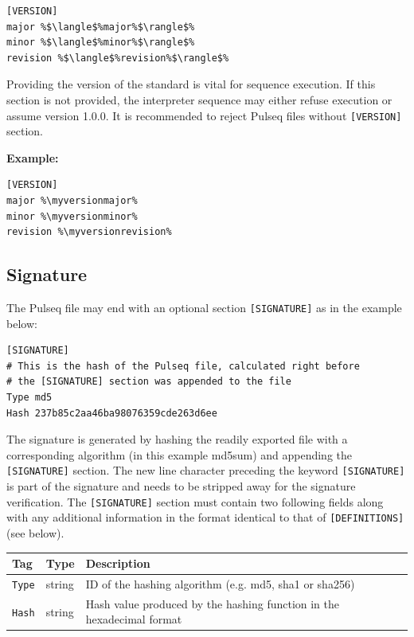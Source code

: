 \documentclass{article}
\def\myversionmajor{1}
\def\myversionminor{5}
\def\myversionrevision{2}
\begin{document}
\begin{lstlisting}[escapechar=\%]
[VERSION]
major %$\langle$%major%$\rangle$%
minor %$\langle$%minor%$\rangle$%
revision %$\langle$%revision%$\rangle$%
\end{lstlisting}

Providing the version of the standard is vital for sequence execution.
If this section is not provided, the interpreter sequence may either refuse execution or assume version 1.0.0. It is recommended to reject Pulseq files without \verb.[VERSION]. section.

\textbf{Example:}
\begin{lstlisting}[escapechar=\%]
[VERSION]
major %\myversionmajor%
minor %\myversionminor%
revision %\myversionrevision%
\end{lstlisting}

\subsection{Signature}

The Pulseq file may end with an optional section \verb.[SIGNATURE]. as in the example below:

\begin{lstlisting}[escapechar=\%]
[SIGNATURE]
# This is the hash of the Pulseq file, calculated right before 
# the [SIGNATURE] section was appended to the file
Type md5
Hash 237b85c2aa46ba98076359cde263d6ee
\end{lstlisting}

The signature is generated by hashing the readily exported file with a corresponding algorithm (in this example md5sum) and appending the \verb.[SIGNATURE]. section. The new line character preceding the keyword \verb.[SIGNATURE]. is part of the signature and needs to be stripped away for the signature verification. The \verb.[SIGNATURE]. section must contain two following fields along with any additional information in the format identical to that of \verb.[DEFINITIONS]. (see below). 

\begin{tabularx}{\textwidth}{llX}
\toprule
Tag & Type & Description\\
\midrule
\verb.Type. & string & ID of the hashing algorithm (e.g. md5, sha1 or sha256) \\
\verb.Hash. & string & Hash value produced by the hashing function in the hexadecimal format \\
\bottomrule
\end{tabularx}
\end{document}
